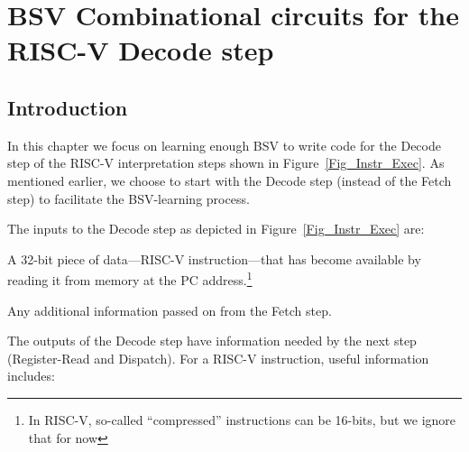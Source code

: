 

\chapter{BSV Combinational circuits for the RISC-V Decode step}


\setcounter{page}{1}
\renewcommand{\thepage}{\arabic{chapter}-\arabic{page}}

\label{ch_Combo_Circuits}


\section{Introduction}

In this chapter we focus on learning enough BSV to write code for the
Decode step of the RISC-V interpretation steps shown in
Figure~\ref{Fig_Instr_Exec}.  As mentioned earlier, we choose
to start with the Decode step (instead of the Fetch step) to
facilitate the BSV-learning process.

The inputs to the Decode step as depicted in
Figure~\ref{Fig_Instr_Exec} are:

\begin{tightlist}

 \item A 32-bit piece of data---RISC-V instruction---that has become
 available by reading it from memory at the PC address.\footnote{In
 RISC-V, so-called ``compressed'' instructions can be 16-bits, but we
 ignore that for now}

 \item Any additional information passed on from the Fetch step.

\end{tightlist}

The outputs of the Decode step have information needed by the next
step (Register-Read and Dispatch).  For a RISC-V instruction, useful
information includes:

